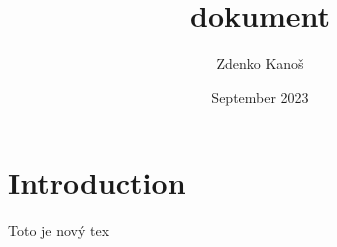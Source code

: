 \documentclass{article}
\title{dokument}
\author{Zdenko Kanoš}
\date{September 2023}
\begin{document}
\maketitle

\section{Introduction}
Toto je nový tex
\end{document}

